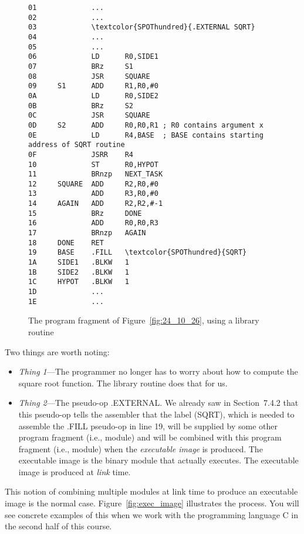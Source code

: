 \documentclass{patt}
\begin{document}
\begin{figure}[h]
\begin{Verbatim}[fontsize=\fontsize{9}{10}\selectfont,commandchars=\\\{\}]
01             ...
02             ...
03             \textcolor{SPOThundred}{.EXTERNAL SQRT}
04             ...
05             ...
06             LD      R0,SIDE1
07             BRz     S1
08             JSR     SQUARE
09     S1      ADD     R1,R0,#0
0A             LD      R0,SIDE2
0B             BRz     S2
0C             JSR     SQUARE
0D     S2      ADD     R0,R0,R1 ; R0 contains argument x
0E             LD      R4,BASE  ; BASE contains starting address of SQRT routine
0F             JSRR    R4
10             ST      R0,HYPOT
11             BRnzp   NEXT_TASK
12     SQUARE  ADD     R2,R0,#0
13             ADD     R3,R0,#0
14     AGAIN   ADD     R2,R2,#-1
15             BRz     DONE
16             ADD     R0,R0,R3
17             BRnzp   AGAIN
18     DONE    RET
19     BASE    .FILL   \textcolor{SPOThundred}{SQRT}
1A     SIDE1   .BLKW   1
1B     SIDE2   .BLKW   1
1C     HYPOT   .BLKW   1
1D             ...
1E             ...
\end{Verbatim}
\caption{The program fragment of Figure~\ref{fig:24_10_26}, using a library routine}
\label{fig:sqrt_external}
\end{figure}

\FloatBarrier
Two things are worth noting:
\begin{itemize}
\item {\em Thing 1}---The programmer no longer has to worry about how
  to compute the square root function.  The library routine does that
  for us.
\item {\em Thing 2}---The pseudo-op .EXTERNAL.  We already saw in
  Section~7.4.2 that this pseudo-op tells the
  assembler that the label (SQRT), which is needed to assemble the
  .FILL pseudo-op in line 19, will be supplied by some other program
  fragment (i.e., module) and will be combined with this program
  fragment (i.e., module) when the {\em executable image} is produced.
  The executable image is the binary module
  that actually executes.  The executable image is produced at {\em
    link} time.
\end{itemize}

This notion of combining multiple modules at link time to produce an
executable image is the normal case. Figure~\ref{fig:exec_image}
illustrates the process. You will see concrete examples of this when
we work with the programming language C in the second half of this
course.
\end{document}
